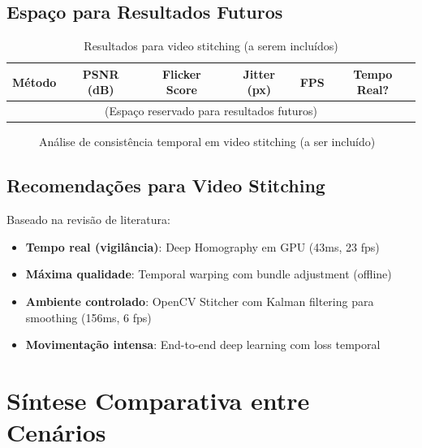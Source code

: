 \subsection{Espaço para Resultados Futuros}

\begin{table}[htb]
\centering
\caption{Resultados para video stitching (a serem incluídos)}
\label{tab:video_results}
\small
\begin{tabular}{lccccc}
\hline
\textbf{Método} & \textbf{PSNR (dB)} & \textbf{Flicker Score} & \textbf{Jitter (px)} & \textbf{FPS} & \textbf{Tempo Real?} \\ \hline
\multicolumn{6}{c}{(Espaço reservado para resultados futuros)} \\
\hline
\end{tabular}
\end{table}

\begin{figure}[htb]
\centering
\caption{Análise de consistência temporal em video stitching (a ser incluído)}
\label{fig:video_temporal}
\end{figure}

\subsection{Recomendações para Video Stitching}

Baseado na revisão de literatura:

\begin{itemize}
    \item \textbf{Tempo real (vigilância)}: Deep Homography em GPU (43ms, 23 fps)
    \item \textbf{Máxima qualidade}: Temporal warping com bundle adjustment (offline)
    \item \textbf{Ambiente controlado}: OpenCV Stitcher com Kalman filtering para smoothing (156ms, 6 fps)
    \item \textbf{Movimentação intensa}: End-to-end deep learning com loss temporal
\end{itemize}

\section{Síntese Comparativa entre Cenários}

